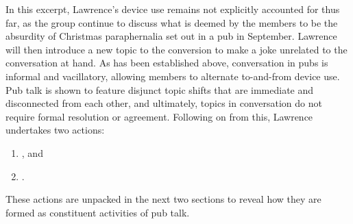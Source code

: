 \begin{revisedsubmission}
In this excerpt, Lawrence's device use remains not explicitly accounted for thus far, as the group continue to discuss what is deemed by the members to be the absurdity of Christmas paraphernalia set out in a pub in September. Lawrence will then introduce a new topic to the conversion to make a joke unrelated to the conversation at hand.
As has been established above, conversation in pubs is informal and vacillatory, allowing members to alternate to-and-from device use.
Pub talk is shown to feature disjunct topic shifts that are immediate and disconnected from each other, and ultimately, topics in conversation do not require formal resolution or agreement.
Following on from this, Lawrence undertakes two actions:
\begin{enumerate}[label=(\roman*)]
    \item {}, and
    \item {}.
\end{enumerate}
These actions are unpacked in the next two sections to reveal how they are formed as constituent activities of pub talk.
\end{revisedsubmission}






